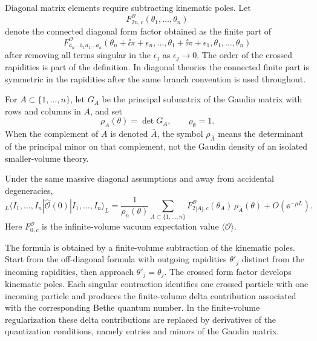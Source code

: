 Diagonal matrix elements require subtracting kinematic poles.  Let
\[
  F^{\mathcal O}_{2n,c}(\theta_1,\ldots,\theta_n)
\]
denote the connected diagonal form factor obtained as the finite part of
\[
  F^{\mathcal O}_{\bar a_n\ldots\bar a_1a_1\ldots a_n}
  (\theta_n+\ii\pi+\epsilon_n,\ldots,\theta_1+\ii\pi+\epsilon_1,
  \theta_1,\ldots,\theta_n)
\]
after removing all terms singular in the \(\epsilon_j\) as
\(\epsilon_j\to0\).  The order of the crossed rapidities is part of the
definition.  In diagonal theories the connected finite part is symmetric in
the rapidities after the same branch convention is used throughout.

\begin{definition}
\label{def:gaudin-principal-minors}
For \(A\subset\{1,\ldots,n\}\), let \(G_A\) be the principal submatrix of
the Gaudin matrix with rows and columns in \(A\), and set
\[
  \rho_A(\theta)=\det G_A,
  \qquad
  \rho_\emptyset=1 .
\]
When the complement of \(A\) is denoted \(\bar A\), the symbol
\(\rho_{\bar A}\) means the determinant of the principal minor on that
complement, not the Gaudin density of an isolated smaller-volume theory.
\end{definition}

\begin{controlledapproximation}
\label{ca:diagonal-finite-volume-form-factor}
Under the same massive diagonal assumptions and away from accidental
degeneracies,
\begin{equation}
  {}_L\!\langle I_1,\ldots,I_n|
  \widehat{\mathcal O}(0)
  |I_1,\ldots,I_n\rangle_L
  =
  \frac{1}{\rho_n(\theta)}
  \sum_{A\subset\{1,\ldots,n\}}
  F^{\mathcal O}_{2|A|,c}(\theta_A)\,
  \rho_{\bar A}(\theta)
  +
  O(\ee^{-\mu L}).
  \label{eq:diagonal-finite-volume-form-factor}
\end{equation}
Here \(F^{\mathcal O}_{0,c}\) is the infinite-volume vacuum expectation value
\(\langle\mathcal O\rangle\).
\end{controlledapproximation}

The formula is obtained by a finite-volume subtraction of the kinematic poles.
Start from the off-diagonal formula with outgoing rapidities
\(\theta'_j\) distinct from the incoming rapidities, then approach
\(\theta'_j=\theta_j\).  The crossed form factor develops kinematic poles.
Each singular contraction identifies one crossed particle with one incoming
particle and produces the finite-volume delta contribution associated with
the corresponding Bethe quantum number.  In the finite-volume regularization
these delta contributions are replaced by derivatives of the quantization
conditions, namely entries and minors of the Gaudin matrix.

